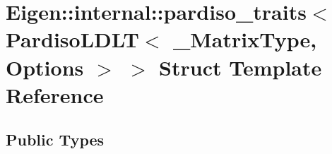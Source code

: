 \hypertarget{struct_eigen_1_1internal_1_1pardiso__traits_3_01_pardiso_l_d_l_t_3_01___matrix_type_00_01_options_01_4_01_4}{}\section{Eigen\+:\+:internal\+:\+:pardiso\+\_\+traits$<$ Pardiso\+L\+D\+LT$<$ \+\_\+\+Matrix\+Type, Options $>$ $>$ Struct Template Reference}
\label{struct_eigen_1_1internal_1_1pardiso__traits_3_01_pardiso_l_d_l_t_3_01___matrix_type_00_01_options_01_4_01_4}
\subsection*{Public Types}
